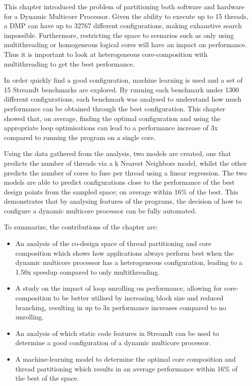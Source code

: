 This chapter introduced the problem of partitioning both software and hardware for a Dynamic Multicore Processor.
Given the ability to execute up to 15 threads, a DMP can have up to 32767 different configurations, making exhaustive search impossible.
Furthermore, restricting the space to scenarios such as only using multithreading or homogeneous logical cores will have an impact on performance.
Thus it is important to look at heterogeneous core-composition with multithreading to get the best performance.

In order quickly find a good configuration, machine learning is used and a set of 15 StreamIt benchmarks are explored.
By running each benchmark under 1300 different configurations, each benchmark was analysed to understand how much performance can be obtained through the best configuration.
This chapter showed that, on average, finding the optimal configuration and using the appropriate loop optimisations can lead to a performance increase of 3x compared to running the program on a single core.

Using the data gathered from the analysis, two models are created, one that predicts the number of threads via a k Nearest Neighbors model, whilst the other predicts the number of cores to fuse per thread using a linear regression.
The two models are able to predict configurations close to the performance of the best design points from the sampled space; on average within 16\% of the best.
This demonstrates that by analysing features of the programs, the decision of how to configure a dynamic multicore processor can be fully automated.

To summarize, the contributions of the chapter are:
\begin{itemize}
\item An analysis of the co-design space of thread partitioning and core composition which shows how applications always perform best when the dynamic multicore processor has a heterogeneous configuration, leading to a 1.50x speedup compared to only multithreading.
\vspace{-1em}
\item A study on the impact of loop unrolling on performance, allowing for core-composition to be better utilised by increasing block size and reduced branching, resulting in up to 3x performance increases compared to no unrolling.
\vspace{-1em}
\item An analysis of which static code features in StreamIt can be used to determine a good configuration of a dynamic multicore processor.
\vspace{-1em}
\item A machine-learning model to determine the optimal core composition and thread partitioning which results in an average performance within 16\% of the best of the space.
\end{itemize}
